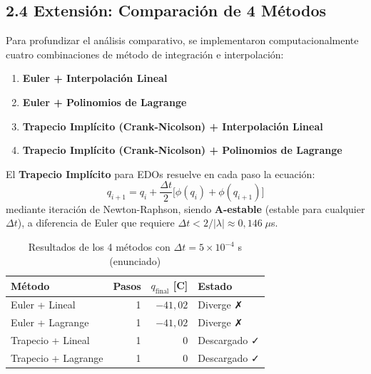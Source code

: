 \documentclass[12pt,a4paper]{article}
\begin{document}
\subsection{2.4 Extensión: Comparación de 4 Métodos}

Para profundizar el análisis comparativo, se implementaron computacionalmente
cuatro combinaciones de método de integración e interpolación:

\begin{enumerate}
    \item \textbf{Euler + Interpolación Lineal}
    \item \textbf{Euler + Polinomios de Lagrange}
    \item \textbf{Trapecio Implícito (Crank-Nicolson) + Interpolación Lineal}
    \item \textbf{Trapecio Implícito (Crank-Nicolson) + Polinomios de Lagrange}
\end{enumerate}

El \textbf{Trapecio Implícito} para EDOs resuelve en cada paso la ecuación:
\begin{equation}
    q_{i+1} = q_i + \frac{\Delta t}{2}\bigl[\phi(q_i) + \phi(q_{i+1})\bigr]
\end{equation}
mediante iteración de Newton-Raphson, siendo \textbf{A-estable} (estable para
cualquier $\Delta t$), a diferencia de Euler que requiere
$\Delta t < 2/|\lambda| \approx 0{,}146\;\mu$s.

\begin{table}[H]
    \centering
    \caption{Resultados de los 4 métodos con $\Delta t = 5\times10^{-4}$ s (enunciado)}
    \begin{tabular}{lrrl}
        \toprule
        \textbf{Método} & \textbf{Pasos} & \textbf{$q_{\text{final}}$ [C]} & \textbf{Estado} \\
        \midrule
        Euler + Lineal    & 1 & $-41{,}02$ & Diverge ✗ \\
        Euler + Lagrange  & 1 & $-41{,}02$ & Diverge ✗ \\
        Trapecio + Lineal  & 1 & $0$ & Descargado ✓ \\
        Trapecio + Lagrange & 1 & $0$ & Descargado ✓ \\
        \bottomrule
    \end{tabular}
\end{table}
\end{document}
